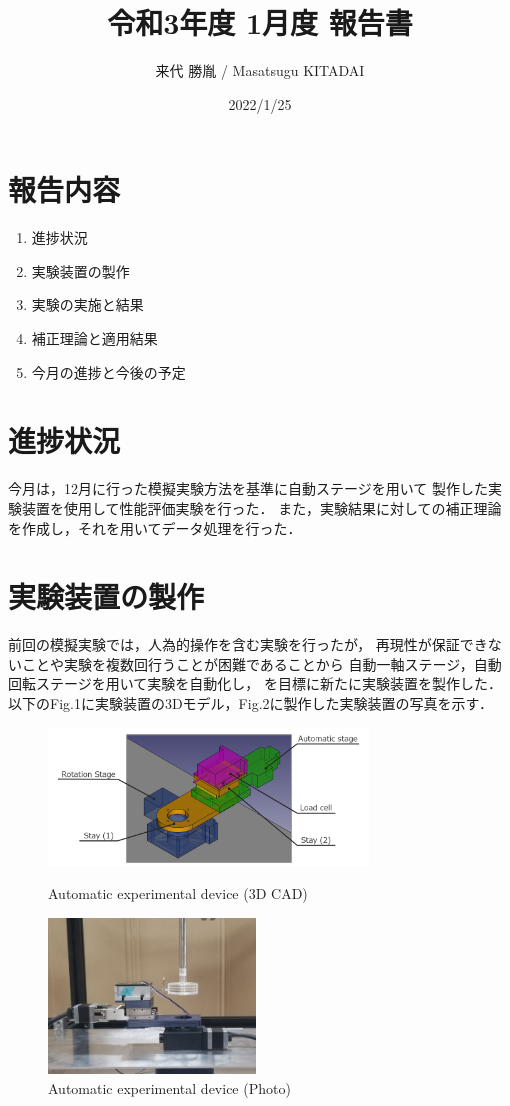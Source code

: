 \documentclass[twocolumn,a4j]{jsarticle}
\author{来代 勝胤 / Masatsugu KITADAI}
\title{令和3年度 1月度 報告書}
\date{2022/1/25}
\begin{document}
\columnseprule=0.1mm

\maketitle
\section*{報告内容}
\begin{enumerate}[1.]
    \item 進捗状況
    \item 実験装置の製作
    \item 実験の実施と結果
    \item 補正理論と適用結果
    \item 今月の進捗と今後の予定
\end{enumerate}

\section{進捗状況}
今月は，12月に行った模擬実験方法を基準に自動ステージを用いて
製作した実験装置を使用して性能評価実験を行った．
また，実験結果に対しての補正理論を作成し，それを用いてデータ処理を行った．

\section{実験装置の製作}

前回の模擬実験では，人為的操作を含む実験を行ったが，
再現性が保証できないことや実験を複数回行うことが困難であることから
自動一軸ステージ，自動回転ステージを用いて実験を自動化し，
を目標に新たに実験装置を製作した．
以下のFig.1に実験装置の3Dモデル，Fig.2に製作した実験装置の写真を示す．

\begin{figure}[htbp]
    \footnotesize
    \begin{center}
        \includegraphics[width=85mm]{../images/21-1.png}
        \caption{Automatic experimental device (3D CAD)}
        \includegraphics[width=55mm]{../images/device_01.jpg}
        \caption{Automatic experimental device (Photo)}
    \end{center}
\end{figure}
\end{document}
